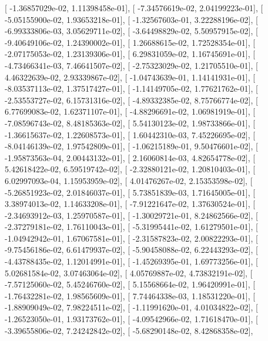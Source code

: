 \documentclass{article}
\begin{document}
       [ -1.36857029e-02,   1.11398458e-01],
       [ -7.34576619e-02,   2.04199223e-01],
       [ -5.05155900e-02,   1.93653218e-01],
       [ -1.32567603e-01,   3.22288196e-02],
       [ -6.99333806e-03,   3.05629711e-02],
       [ -3.64498829e-02,   5.50957915e-02],
       [ -9.40649106e-02,   1.24390002e-01],
       [  1.26688615e-02,   1.72528354e-01],
       [ -2.07175053e-02,   1.23139306e-01],
       [  6.29831059e-02,   1.16745691e-01],
       [ -4.73466341e-03,   7.46641507e-02],
       [ -2.75323029e-02,   1.21705510e-01],
       [  4.46322639e-02,   2.93339867e-02],
       [ -1.04743639e-01,   1.14141931e-01],
       [ -8.03537113e-02,   1.37517427e-01],
       [ -1.14149705e-02,   1.77621762e-01],
       [ -2.53553727e-02,   6.15731316e-02],
       [ -4.89332385e-02,   8.75766774e-02],
       [  6.77699083e-02,   1.62371107e-01],
       [ -4.88296691e-02,   1.06981919e-01],
       [ -7.08596743e-02,   8.48185363e-02],
       [  5.54130123e-02,   1.98733866e-01],
       [ -1.36615637e-02,   1.22608573e-01],
       [  1.60442310e-03,   7.45226695e-02],
       [ -8.04146139e-02,   1.97542809e-01],
       [ -1.06215189e-01,   9.50476601e-02],
       [ -1.95873563e-04,   2.00443132e-01],
       [  2.16060814e-03,   4.82654778e-02],
       [  5.42618422e-02,   6.59519742e-02],
       [ -2.32880121e-02,   1.20810403e-01],
       [  6.02997093e-04,   1.15953959e-02],
       [  4.01476267e-02,   2.15353598e-02],
       [ -5.26851923e-02,   2.01846037e-01],
       [  5.73851839e-03,   1.71645005e-01],
       [  3.38974013e-02,   1.14633208e-01],
       [ -7.91221647e-02,   1.37630524e-01],
       [ -2.34693912e-03,   1.25970587e-01],
       [ -1.30029721e-01,   8.24862566e-02],
       [ -2.37279181e-02,   1.76110043e-01],
       [ -5.31995441e-02,   1.61279501e-01],
       [ -1.04942942e-01,   1.67067581e-01],
       [ -2.31587823e-02,   2.00822293e-01],
       [ -9.75456186e-02,   6.61479937e-02],
       [ -5.90458088e-02,   6.22443293e-02],
       [ -4.43788435e-02,   1.12014991e-01],
       [ -1.45269395e-01,   1.69773256e-01],
       [  5.02681584e-02,   3.07463064e-02],
       [  4.05769887e-02,   4.73832191e-02],
       [ -7.57125060e-02,   5.45246760e-02],
       [  5.15568664e-02,   1.96420991e-01],
       [ -1.76432281e-02,   1.98565609e-01],
       [  7.74464338e-03,   1.18531220e-01],
       [ -1.88909049e-02,   7.98224511e-02],
       [ -1.11991620e-01,   4.01034822e-02],
       [ -1.26523050e-01,   1.93173762e-01],
       [ -4.09542966e-02,   1.71618470e-01],
       [ -3.39655806e-02,   7.24242842e-02],
       [ -5.68290148e-02,   8.42868358e-02],
\end{document}
